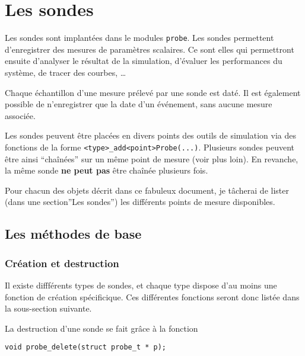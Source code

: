 %
\section{Les sondes}
\label{section:sondes}

   Les sondes sont implantées dans le modules {\tt probe}. Les sondes
permettent d'enregistrer des mesures de paramètres scalaires. Ce sont
elles qui permettront ensuite d'analyser le résultat de la simulation,
d'évaluer les performances du système, de tracer des courbes, \ldots

   Chaque échantillon d'une mesure prélevé par une sonde est daté. Il
est également possible de n'enregistrer que la date d'un événement,
sans aucune mesure associée.

   Les sondes peuvent être placées en divers points des outils de
simulation via des fonctions de la forme
\lstinline!<type>_add<point>Probe(...)!. Plusieurs sondes peuvent être
ainsi ``chaînées'' sur un même point de mesure (voir plus loin). En
revanche, la même sonde {\bf ne peut pas} être chaînée plusieurs fois.

   Pour chacun des objets décrit dans ce fabuleux document, je
tâcherai de lister (dans une section''Les sondes'') les différents
points de mesure disponibles.

%
\subsection{Les méthodes de base}

%
\subsubsection{Création et destruction}

   Il existe diffférents types de sondes, et chaque type dispose d'au
moins une fonction de création spécificique. Ces différentes fonctions
seront donc listée dans la sous-section suivante.

   La destruction d'une sonde se fait grâce à la fonction 

\begin{verbatim}
void probe_delete(struct probe_t * p);
\end{verbatim}

